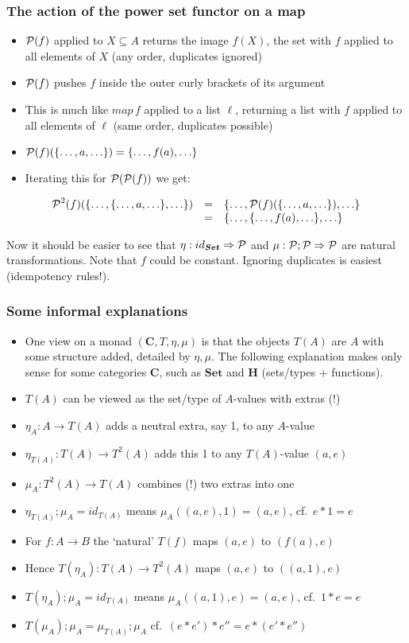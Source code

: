 \documentclass[handout]{beamer}
\newcommand{\To}{\Rightarrow}
\newcommand{\bfsf}[1]{{\boldsymbol{#1}}}
\newcommand{\Set}{\bfsf{Set}}
\newcommand{\CC}{\bfsf{C}}
\newcommand{\HH}{\bfsf{H}}
\begin{document}
\frame
  {   
    \frametitle{The action of the power set functor on a map}\label{Mon5:PowSetActMap}

 \begin{itemize}[<+->]
\item $\operatorname{\mathcal{P}}(f)$ applied to $X\subseteq A$ returns the {\color{red}image}
$f(X)$, the set with $f$ applied to all elements of $X$
(any order, duplicates ignored)
\item $\operatorname{\mathcal{P}}(f)$ pushes $f$ inside the outer curly brackets of its argument
\item This is much like $map\, f$ applied to a list $\ell$, returning a list with $f$ 
applied to all elements of $\ell$ (same order, duplicates possible)

\item $\operatorname{\mathcal{P}}(f)(\{\ldots,a,\ldots\}) = \{\ldots,f(a),\ldots\}$ 
\item Iterating this for $\operatorname{\mathcal{P}}(\operatorname{\mathcal{P}}(f))$ we get:
 \end{itemize}
$$\begin{array}{rcl}\operatorname{\mathcal{P}}^2(f)(\{\ldots,\{\ldots,a,\ldots\},\ldots\})& = &
 \{\ldots,\operatorname{\mathcal{P}}(f)(\{\ldots,a,\ldots\}),\ldots\}\\
& = & 
 \{\ldots,\{\ldots,f(a),\ldots\},\ldots\}\end{array}$$

Now it should be easier to see that $\eta:id_\Set\To\powset$ and
$\mu:\powset;\powset\To\powset$ are natural transformations.
Note that $f$ could be constant. Ignoring duplicates is easiest
(idempotency rules!).
 }
\frame
  {   
    \frametitle{Some informal explanations}\label{Mon5:InfoMonad}

 \begin{itemize}[<+->]
\item One view on a monad $(\CC,T,\eta,\mu)$ is that the objects $T(A)$ are $A$
with some structure added, detailed by $\eta,\mu$. The following explanation
makes only sense for some categories $\CC$, such as $\Set$ and $\HH$ 
(sets/types + functions).
\item $T(A)$ can be viewed as the set/type of $A$-values with {\color{red}extras (!)}
\item $\eta_A : A\to T(A)$ adds a neutral extra, say 1, to any $A$-value
\item $\eta_{T(A)} : T(A)\to T^2(A)$ adds this 1 to any $T(A)$-value $(a,e)$
\item $\mu_A: T^2(A)\to T(A)$ {\color{red}combines (!)} two extras into one
\item $\eta_{T(A)};\mu_A = id_{T(A)}$ means $\mu_A((a,e),1) = (a,e)$, cf.\ $e*1=e$
\item For $f:A\to B$ the `natural' $T(f)$ maps $(a,e)$ to $(f(a),e)$
\item Hence $T(\eta_A) : T(A)\to T^2(A)$ maps $(a,e)$ to $((a,1),e)$
\item $T(\eta_A);\mu_A=id_{T(A)}$ means $\mu_A((a,1),e) = (a,e)$, cf.\ $1*e=e$
\item $T(\mu_A);\mu_A = \mu_{T(A)};\mu_A$ cf.\ $(e*e')*e'' = e*(e'*e'')$
 \end{itemize}

 }
\end{document}
